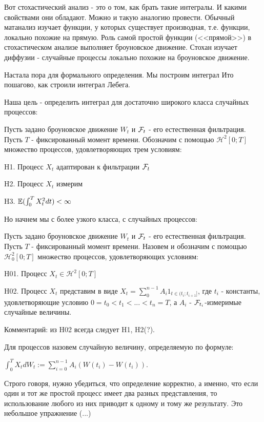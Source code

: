 {Вот стохастический анализ - это о том, как брать такие интегралы. И какими свойствами они обладают. Можно и такую аналогию провести. Обычный матанализ изучает функции, у которых существует производная, т.е. функции, локально похожие на прямую. Роль самой простой функции (<<прямой>>) в стохастическом анализе выполняет броуновское движение. Стохан изучает диффузии - случайные процессы локально похожие на броуновское движение.


Настала пора для формального определения. Мы построим интеграл Ито пошагово, как строили интеграл Лебега.

Наша цель - определить интеграл для достаточно широкого класса случайных процессов:

\begin{mydef} Пусть задано броуновское движение $W_{t}$ и $\mathcal{F}_{t}$ - его естественная фильтрация. Пусть $T$ - фиксированный момент времени. Обозначим с помощью $\mathcal{H}^{2}[0;T]$ множество процессов, удовлетворяющих трем условиям:

H1. Процесс $X_{t}$ адаптирован к фильтрации $\mathcal{F}_{t}$

H2. Процесс $X_{t}$ измерим

H3. $\mathbb{E}(\int_{0}^{T}X_{t}^{2}dt)<\infty$
\end{mydef}
Но начнем мы с более узкого класса, с  случайных процессов:

\begin{mydef} Пусть задано броуновское движение $W_{t}$ и $\mathcal{F}_{t}$ - его естественная фильтрация. Пусть $T$ - фиксированный момент времени. Назовем  и обозначим с помощью $\mathcal{H}_{0}^{2}[0;T]$ множество процессов, удовлетворяющих условиям:

H01. Процесс $X_{t}\in\mathcal{H}^{2}[0;T]$

H02. Процесс $X_{t}$ представим в виде $X_{t}=\sum_{0}^{n-1}A_{i}1_{t\in(t_{i};t_{i+1}]}$, где $t_{i}$ - константы, удовлетворяющие условию $0=t_{0}<t_{1}<...<t_{n}=T$, а $A_{i}$ - $\mathcal{F}_{t_{i}}$-измеримые случайные величины.
\end{mydef}
\begin{myex}
\end{myex}


Комментарий: из H02 всегда следует H1, H2(?).

\begin{mydef} Для  процессов назовем  случайную величину, определяемую по формуле:

$\int_{0}^{T}X_{t}dW_{t}:=\sum_{i=0}^{n-1}A_{i}(W(t_{i})-W(t_{i}))$.
\end{mydef}
Строго говоря, нужно убедиться, что определение корректно, а именно, что если один и тот же простой процесс имеет два разных представления, то использование любого из них приводит к одному и тому же результату. Это небольшое упражнение (...)

}
